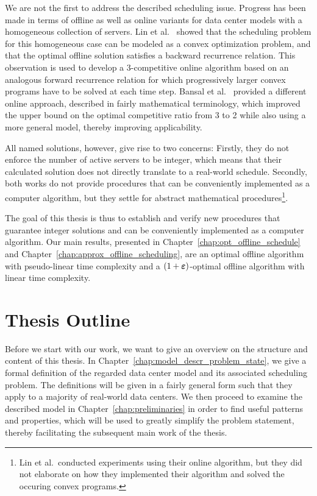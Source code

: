 We are not the first to address the described scheduling issue. Progress has been made in terms of offline as well as online variants for data center models with a homogeneous collection of servers. Lin et al.~\parencite{dyn-right-sizing} showed that the scheduling problem for this homogeneous case can be modeled as a convex optimization problem, and that the optimal offline solution satisfies a backward recurrence relation. This observation is used to develop a 3-competitive online algorithm based on an analogous forward recurrence relation for which progressively larger convex programs have to be solved at each time step. Bansal et al.~\parencite{bansal-soco} provided a different online approach, described in fairly mathematical terminology, which improved the upper bound on the optimal competitive ratio from 3 to 2 while also using a more general model, thereby improving applicability. 

All named solutions, however, give rise to two concerns: Firstly, they do not enforce the number of active servers to be integer, which means that their calculated solution does not directly translate to a real-world schedule. Secondly, both works do not provide procedures that can be conveniently implemented as a computer algorithm, but they settle for abstract mathematical procedures\footnote{Lin et al.\ conducted experiments using their online algorithm, but they did not elaborate on how they implemented their algorithm and solved the occuring convex programs.}.

The goal of this thesis is thus to establish and verify new procedures that guarantee integer solutions and can be conveniently implemented as a computer algorithm. Our main results, presented in Chapter~\ref{chap:opt_offline_schedule} and Chapter~\ref{chap:approx_offline_scheduling}, are an optimal offline algorithm with pseudo-linear time complexity and a $(1+\boldsymbol\varepsilon)$-optimal offline algorithm with linear time complexity.

\section{Thesis Outline}
Before we start with our work, we want to give an overview on the structure and content of this thesis. In Chapter~\ref{chap:model_descr_problem_state}, we give a formal definition of the regarded data center model and its associated scheduling problem. The definitions will be given in a fairly general form such that they apply to a majority of real-world data centers. We then proceed to examine the described model in Chapter~\ref{chap:preliminaries} in order to find useful patterns and properties, which will be used to greatly simplify the problem statement, thereby facilitating the subsequent main work of the thesis.

